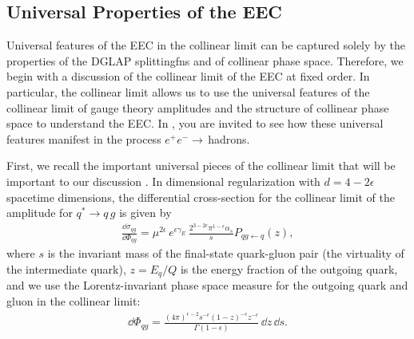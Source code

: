 

\subsection{Universal Properties of the EEC}
\label{sec:eec-universal}

Universal features of the EEC in the collinear limit can be captured solely by the properties of the DGLAP \glspl{splittingfn} and of collinear phase space.
%
Therefore, we begin with a discussion of the collinear limit of the EEC at fixed order.
%
In particular, the collinear limit allows us to use the universal features of the collinear limit of gauge theory amplitudes and the structure of collinear phase space to understand the EEC.
%
In , you are invited to see how these universal features manifest in the process \(e^+ e^-\to\,\)hadrons.

First, we recall the important universal pieces of the collinear limit that will be important to our discussion \cite{Altarelli:1977zs,PhysRevD.9.980,PhysRevD.46.1980,Ritzmann:2014mka}.
%
In dimensional regularization with \(d = 4 - 2\epsilon\) spacetime dimensions, the differential cross-section for the collinear limit of the amplitude for \(q^* \to q\,g\) is given by
\begin{align}
    \label{eq:collinear_xsec}
    \frac{\dd \sigma_{qg}}{\dd \Phi_{qg}}
    =
    \mu^{2\epsilon}\,
    e^{\epsilon \gamma_E}
    \,
    \frac{2^{3-2\epsilon} \pi^{1-\epsilon}  \alpha_s}{s} P_{qg\leftarrow q}(z)
    ,
\end{align}
where \(s\) is the invariant mass of the final-state quark-gluon pair (the virtuality of the intermediate quark), \(z = E_q/Q\) is the energy fraction of the outgoing quark, and we use the Lorentz-invariant phase space measure for the outgoing quark and gluon in the collinear limit:
\begin{align}
    \label{eq:collinear_phase_space}
    \dd \Phi_{qg}
    =
    \frac{
        {(4\pi)}^{\epsilon-2}
        s^{-\epsilon}
        {(1-z)}^{-\epsilon} z^{-\epsilon}
    }
    {\Gamma(1-\epsilon)}
    \,
    \dd z \, \dd s
    .
\end{align}
%


